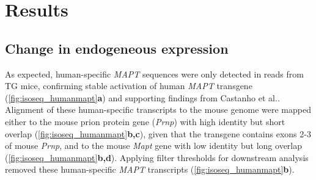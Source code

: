 \clearpage 
\section{Results}

\subsection{Change in endogeneous expression}
As expected, human-specific \textit{MAPT} sequences were only detected in reads from TG mice, confirming stable activation of human \textit{MAPT} transgene (\cref{fig:isoseq_humanmapt}\textbf{a}) and supporting findings from Castanho et al.\cite{Castanho2020}. Alignment of these human-specific transcripts to the mouse genome were mapped either to the mouse prion protein gene (\textit{Prnp}) with high identity but short overlap (\cref{fig:isoseq_humanmapt}\textbf{b,c}), given that the transgene contains exons 2-3 of mouse \textit{Prnp}\cite{Ramsden2005}, and to the mouse \textit{Mapt} gene with low identity but long overlap (\cref{fig:isoseq_humanmapt}\textbf{b,d}). Applying filter thresholds for downstream analysis removed these human-specific \textit{MAPT} transcripts (\cref{fig:isoseq_humanmapt}\textbf{b}). 

